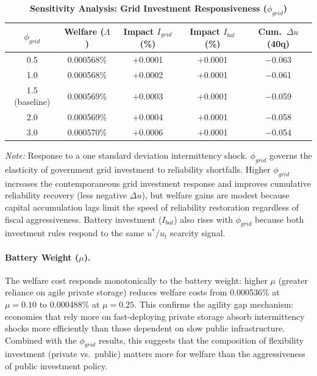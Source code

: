 \documentclass[12pt, a4paper]{article}
\begin{document}
\begin{table}[H]
    \centering
    \caption{\textbf{Sensitivity Analysis: Grid Investment Responsiveness ($\phi_{grid}$)}}
    \label{tab:phi_grid_sensitivity}
    \renewcommand{\arraystretch}{1.3}
    \small
    \begin{tabular}{c c c c c}
        \toprule
        $\phi_{grid}$ & \textbf{Welfare ($\Lambda$)} & \textbf{Impact $I_{grid}$ (\%)} & \textbf{Impact $I_{bat}$ (\%)} & \textbf{Cum.\ $\Delta u$ (40q)} \\
        \midrule
        0.5 & 0.000568\% & $+$0.0001 & $+$0.0001 & $-$0.063 \\
        1.0 & 0.000568\% & $+$0.0002 & $+$0.0001 & $-$0.061 \\
        1.5 (baseline) & 0.000569\% & $+$0.0003 & $+$0.0001 & $-$0.059 \\
        2.0 & 0.000569\% & $+$0.0004 & $+$0.0001 & $-$0.058 \\
        3.0 & 0.000570\% & $+$0.0006 & $+$0.0001 & $-$0.054 \\
        \bottomrule
    \end{tabular}
    \vspace{0.2cm}
    \parbox{\textwidth}{\footnotesize \textit{Note:} Response to a one standard deviation intermittency shock. $\phi_{grid}$ governs the elasticity of government grid investment to reliability shortfalls. Higher $\phi_{grid}$ increases the contemporaneous grid investment response and improves cumulative reliability recovery (less negative $\Delta u$), but welfare gains are modest because capital accumulation lags limit the speed of reliability restoration regardless of fiscal aggressiveness. Battery investment ($I_{bat}$) also rises with $\phi_{grid}$ because both investment rules respond to the same $u^*/u_t$ scarcity signal.}
\end{table}

\paragraph{Battery Weight ($\mu$).} The welfare cost responds monotonically to the battery weight: higher $\mu$ (greater reliance on agile private storage) reduces welfare costs from 0.000536\% at $\mu = 0.10$ to 0.000488\% at $\mu = 0.25$. This confirms the agility gap mechanism: economies that rely more on fast-deploying private storage absorb intermittency shocks more efficiently than those dependent on slow public infrastructure. Combined with the $\phi_{grid}$ results, this suggests that the composition of flexibility investment (private vs.\ public) matters more for welfare than the aggressiveness of public investment policy.
\end{document}
